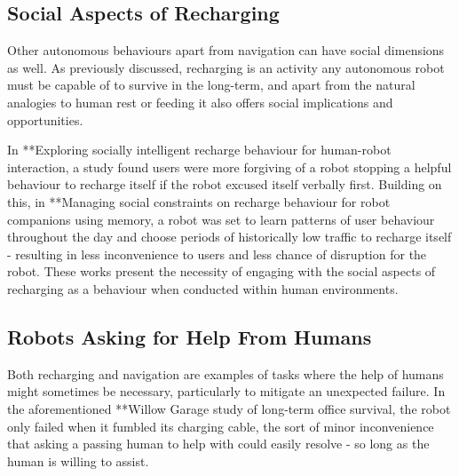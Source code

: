 \documentclass{sfuthesis}
\begin{document}

\subsection{Social Aspects of Recharging}

Other autonomous behaviours apart from navigation can have social dimensions as well. As previously discussed, recharging is an activity any autonomous robot must be capable of to survive in the long-term, and apart from the natural analogies to human rest or feeding it also offers social implications and opportunities.

In **Exploring socially intelligent recharge behaviour for human-robot interaction, a study found users were more forgiving of a robot stopping a helpful behaviour to recharge itself if the robot excused itself verbally first. Building on this, in **Managing social constraints on recharge behaviour for robot companions using memory, a robot was set to learn patterns of user behaviour throughout the day and choose periods of historically low traffic to recharge itself - resulting in less inconvenience to users and less chance of disruption for the robot. These works present the necessity of engaging with the social aspects of recharging as a behaviour when conducted within human environments.



\subsection{Robots Asking for Help From Humans}

Both recharging and navigation are examples of tasks where the help of humans might sometimes be necessary, particularly to mitigate an unexpected failure. In the aforementioned **Willow Garage study of long-term office survival, the robot only failed when it fumbled its charging cable, the sort of minor inconvenience that asking a passing human to help with could easily resolve - so long as the human is willing to assist.
\end{document}
